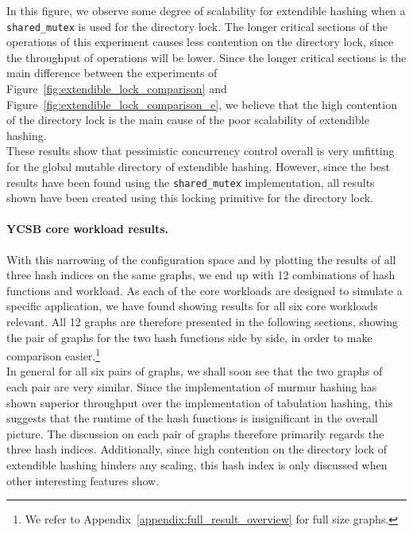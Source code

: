 \documentclass[11pt]{article} %
\begin{document}
In this figure, we observe some degree of scalability for extendible hashing when a \verb|shared_mutex| is used for the directory lock. The longer critical sections of the operations of this experiment causes less contention on the directory lock, since the throughput of operations will be lower. Since the longer critical sections is the main difference between the experiments of Figure~\ref{fig:extendible_lock_comparison} and Figure~\ref{fig:extendible_lock_comparison_e}, we believe that the high contention of the directory lock is the main cause of the poor scalability of extendible hashing.\\

These results show that pessimistic concurrency control overall is very unfitting for the global mutable directory of extendible hashing. However, since the best results have been found using the \verb|shared_mutex| implementation, all results shown have been created using this locking primitive for the directory lock. \\

\paragraph{YCSB core workload results.} With this narrowing of the configuration space and by plotting the results of all three hash indices on the same graphs, we end up with 12 combinations of hash functions and workload. As each of the core workloads are designed to simulate a specific application, we have found showing results for all six core workloads relevant. All 12 graphs are therefore presented in the following sections, showing the pair of graphs for the two hash functions side by side, in order to make comparison easier.\footnote{We refer to Appendix~\ref{appendix:full_result_overview} for full size graphs.}\\

In general for all six pairs of graphs, we shall soon see that the two graphs of each pair are very similar. Since the implementation of murmur hashing has shown superior throughput over the implementation of tabulation hashing, this suggests that the runtime of the hash functions is insignificant in the overall picture. The discussion on each pair of graphs therefore primarily regards the three hash indices. Additionally, since high contention on the directory lock of extendible hashing hinders any scaling, this hash index is only discussed when other interesting features show.\\
\end{document}
